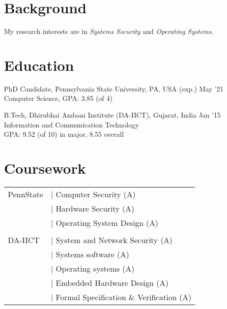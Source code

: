 \documentclass[margin]{res}
\begin{document}
\raggedright
{} %


\begin{resume} 
\section{Background}
My research interests are in \emph{Systems Security} and \emph{Operating Systems}.

\section{Education}

PhD Candidate, Pennsylvania State University, PA, USA \hfill (exp.) May '21\\
Computer Science, GPA: 3.85 (of 4)

B.Tech, Dhirubhai Ambani Institute (DA-IICT), Gujarat, India \hfill Jan '15\\
Information and Communication Technology\\
GPA: 9.52 (of 10) in major,
8.55 overall 

\section{Coursework}
\begin{tabular}{l p{2.5in}}
PennState   & $\vert$ Computer Security (A)\\
            & $\vert$ Hardware Security (A)\\
            & $\vert$ Operating System Design (A)\\
\\
DA-IICT     & $\vert$ System and Network Security (A)\\
            & $\vert$ Systems software (A)\\
            & $\vert$ Operating systems (A)\\
            & $\vert$ Embedded Hardware Design (A)\\
            & $\vert$ Formal Specification \& Verification (A)
\end{tabular}


\end{resume}
\end{document}
